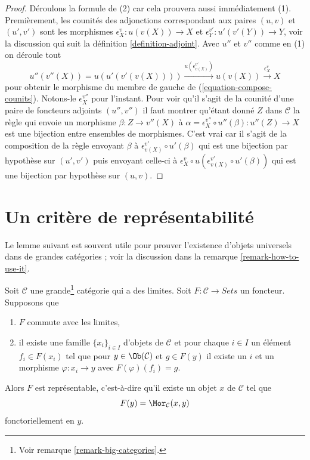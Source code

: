\begin{proof}
Déroulons la formule de (2) car cela prouvera aussi immédiatement (1).
Premièrement, les counités des adjonctions correspondant aux paires $(u, v)$ et $(u', v')$
sont les morphismes $\epsilon_X^v : u(v(X)) \to X$ et $\epsilon_Y^{v'} : u'(v'(Y)) \to Y$, voir la discussion qui suit la définition
\ref{definition-adjoint}. Avec $u''$ et $v''$ comme en (1) on déroule tout
$$
u''(v''(X)) = u(u'(v'(v(X)))) \xrightarrow{u(\epsilon_{v(X)}^{v'})}
u(v(X)) \xrightarrow{\epsilon_X^v} X
$$
pour obtenir le morphisme du membre de gauche de
(\ref{equation-compose-counits}). Notons-le $\epsilon_X^{v''}$ pour
l'instant. Pour voir qu'il s'agit de la counité d'une paire de foncteurs adjoints $(u'', v'')$
il faut montrer qu'étant donné $Z$ dans $\mathcal{C}$ la règle qui envoie un
morphisme $\beta : Z \to v''(X)$ à $\alpha = \epsilon_X^{v''} \circ u''(\beta) : u''(Z) \to X$ est une bijection entre ensembles de morphismes. C'est vrai
car il s'agit de la composition de la règle envoyant $\beta$ à
$\epsilon_{v(X)}^{v'} \circ u'(\beta)$ qui est une bijection par hypothèse sur
$(u', v')$ puis envoyant celle-ci à $\epsilon_X^v \circ u(\epsilon_{v(X)}^{v'} \circ u'(\beta))$ qui est une bijection par hypothèse sur $(u, v)$.
\end{proof}






\section{Un critère de représentabilité}
\label{section-representable}

\noindent
Le lemme suivant est souvent utile pour prouver l'existence d'objets
universels dans de grandes catégories ; voir la discussion dans
la remarque \ref{remark-how-to-use-it}.

\begin{lemma}
\label{lemma-a-version-of-brown}
Soit $\mathcal{C}$ une grande\footnote{Voir remarque
\ref{remark-big-categories}.} catégorie qui a des limites. Soit $F : \mathcal{C} \to \textit{Sets}$ un foncteur. Supposons que
\begin{enumerate}
\item $F$ commute avec les limites,
\item il existe une famille $\{x_i\}_{i \in I}$ d'objets de $\mathcal{C}$ et
pour chaque $i \in I$ un élément $f_i \in F(x_i)$ tel que pour $y \in \Ob(\mathcal{C})$ et $g \in F(y)$ il existe un $i$ et un morphisme $\varphi : x_i \to y$ avec $F(\varphi)(f_i) = g$.
\end{enumerate}
Alors $F$ est représentable, c'est-à-dire qu'il existe un objet $x$ de
$\mathcal{C}$ tel que
$$
F(y) = \Mor_\mathcal{C}(x, y)
$$
fonctoriellement en $y$.
\end{lemma}

